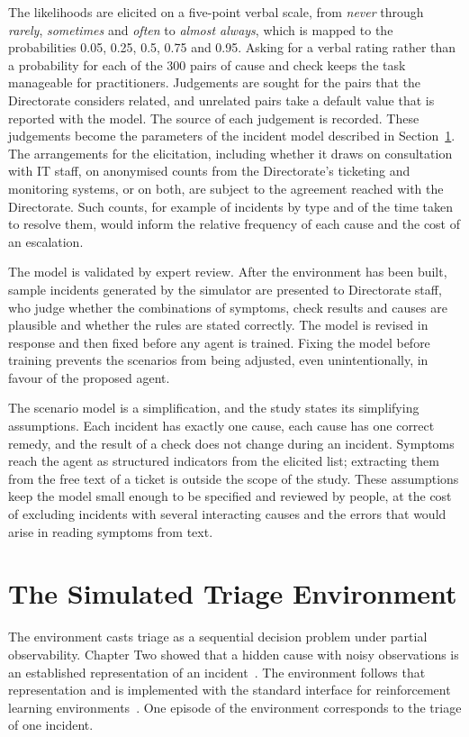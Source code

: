 The likelihoods are elicited on a five-point verbal scale, from \emph{never} through \emph{rarely}, \emph{sometimes} and \emph{often} to \emph{almost always}, which is mapped to the probabilities 0.05, 0.25, 0.5, 0.75 and 0.95. Asking for a verbal rating rather than a probability for each of the 300 pairs of cause and check keeps the task manageable for practitioners. Judgements are sought for the pairs that the Directorate considers related, and unrelated pairs take a default value that is reported with the model. The source of each judgement is recorded. These judgements become the parameters of the incident model described in Section~\ref{sec:environment}. The arrangements for the elicitation, including whether it draws on consultation with IT staff, on anonymised counts from the Directorate's ticketing and monitoring systems, or on both, are subject to the agreement reached with the Directorate. Such counts, for example of incidents by type and of the time taken to resolve them, would inform the relative frequency of each cause and the cost of an escalation.

The model is validated by expert review. After the environment has been built, sample incidents generated by the simulator are presented to Directorate staff, who judge whether the combinations of symptoms, check results and causes are plausible and whether the rules are stated correctly. The model is revised in response and then fixed before any agent is trained. Fixing the model before training prevents the scenarios from being adjusted, even unintentionally, in favour of the proposed agent.

The scenario model is a simplification, and the study states its simplifying assumptions. Each incident has exactly one cause, each cause has one correct remedy, and the result of a check does not change during an incident. Symptoms reach the agent as structured indicators from the elicited list; extracting them from the free text of a ticket is outside the scope of the study. These assumptions keep the model small enough to be specified and reviewed by people, at the cost of excluding incidents with several interacting causes and the errors that would arise in reading symptoms from text.

\section{The Simulated Triage Environment}
\label{sec:environment}

The environment casts triage as a sequential decision problem under partial observability. Chapter Two showed that a hidden cause with noisy observations is an established representation of an incident~\cite{kaelbling1998,kim2025,hammar2026belief}. The environment follows that representation and is implemented with the standard interface for reinforcement learning environments~\cite{towers2024}. One episode of the environment corresponds to the triage of one incident.

